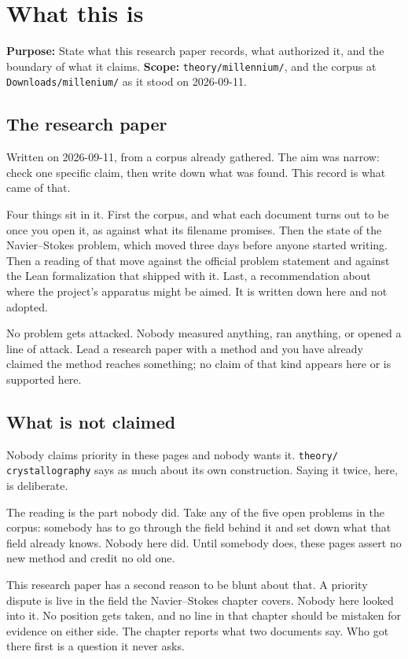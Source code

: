 \chapter{What this is}

\textbf{Purpose:} State what this research paper records, what authorized it, and the boundary of what it
claims. \textbf{Scope:} \texttt{theory/\allowbreak{}millennium/\allowbreak{}}, and the corpus at
\texttt{Downloads/\allowbreak{}millenium/\allowbreak{}} as it stood on 2026-09-11.

\section{The research paper}

Written on 2026-09-11, from a corpus already gathered. The aim was narrow: check one specific
claim, then write down what was found. This record is what came of that.

Four things sit in it. First the corpus, and what each document turns out to be once you open it,
as against what its filename promises. Then the state of the Navier--Stokes problem, which moved
three days before anyone started writing. Then a reading of that move against the official problem
statement and against the Lean formalization that shipped with it. Last, a recommendation about
where the project's apparatus might be aimed. It is written down here and not adopted.

No problem gets attacked. Nobody measured anything, ran anything, or opened a line of attack. Lead
a research paper with a method and you have already claimed the method reaches something; no claim of that
kind appears here or is supported here.

\section{What is not claimed}

Nobody claims priority in these pages and nobody wants it. \texttt{theory/\allowbreak{}%
crystallography} says as much about its own construction. Saying it twice, here, is deliberate.

The reading is the part nobody did. Take any of the five open problems in the corpus: somebody has to
go through the field behind it and set down what that field already knows. Nobody here did. Until
somebody does, these pages assert no new method and credit no old one.

This research paper has a second reason to be blunt about that. A priority dispute is live in the field the
Navier--Stokes chapter covers. Nobody here looked into it. No position gets taken, and no line in
that chapter should be mistaken for evidence on either side. The chapter reports what two documents
say. Who got there first is a question it never asks.

